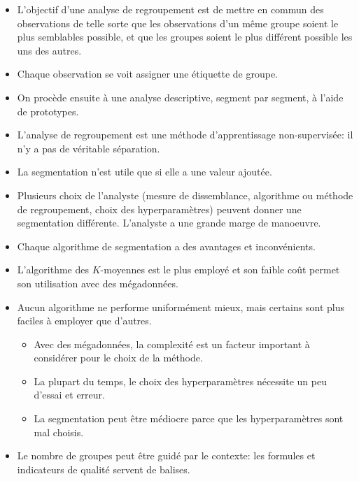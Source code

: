 \documentclass[
  11pt,
  letterpaper,
]{scrbook}
\providecommand{\tightlist}{%
  \setlength{\itemsep}{0pt}\setlength{\parskip}{0pt}}\usepackage{longtable,booktabs,array}
\theoremstyle{definition}
\theoremstyle{remark}
\begin{document}
\begin{tcolorbox}[enhanced jigsaw, coltitle=black, left=2mm, opacitybacktitle=0.6, colback=white, leftrule=.75mm, colframe=quarto-callout-note-color-frame, toprule=.15mm, colbacktitle=quarto-callout-note-color!10!white, opacityback=0, bottomtitle=1mm, toptitle=1mm, rightrule=.15mm, title=\textcolor{quarto-callout-note-color}{\faInfo}\hspace{0.5em}{En résumé}, breakable, titlerule=0mm, arc=.35mm, bottomrule=.15mm]

\begin{itemize}
\tightlist
\item
  L'objectif d'une analyse de regroupement est de mettre en commun des
  observations de telle sorte que les observations d'un même groupe
  soient le plus semblables possible, et que les groupes soient le plus
  différent possible les uns des autres.
\item
  Chaque observation se voit assigner une étiquette de groupe.
\item
  On procède ensuite à une analyse descriptive, segment par segment, à
  l'aide de prototypes.
\item
  L'analyse de regroupement est une méthode d'apprentissage
  non-supervisée: il n'y a pas de véritable séparation.
\item
  La segmentation n'est utile que si elle a une valeur ajoutée.
\item
  Plusieurs choix de l'analyste (mesure de dissemblance, algorithme ou
  méthode de regroupement, choix des hyperparamètres) peuvent donner une
  segmentation différente. L'analyste a une grande marge de manoeuvre.
\item
  Chaque algorithme de segmentation a des avantages et inconvénients.
\item
  L'algorithme des \(K\)-moyennes est le plus employé et son faible coût
  permet son utilisation avec des mégadonnées.
\item
  Aucun algorithme ne performe uniformément mieux, mais certains sont
  plus faciles à employer que d'autres.

  \begin{itemize}
  \tightlist
  \item
    Avec des mégadonnées, la complexité est un facteur important à
    considérer pour le choix de la méthode.
  \item
    La plupart du temps, le choix des hyperparamètres nécessite un peu
    d'essai et erreur.
  \item
    La segmentation peut être médiocre parce que les hyperparamètres
    sont mal choisis.
  \end{itemize}
\item
  Le nombre de groupes peut être guidé par le contexte: les formules et
  indicateurs de qualité servent de balises.
\end{itemize}

\end{tcolorbox}
\end{document}
